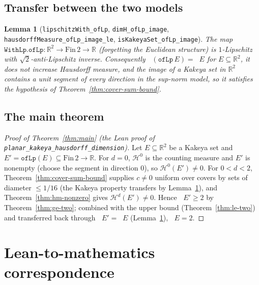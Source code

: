 \documentclass[11pt,a4paper]{article}
\newcommand{\R}{\mathbb{R}}
\DeclareMathOperator{\Hdim}{dim_H}
\newcommand{\HM}[1]{\mathcal{H}^{#1}}                %
\newcommand{\Plane}{\ensuremath{\mathbb{R}^{2}}}     %
\newcommand{\FinTwo}{\ensuremath{\mathrm{Fin}\,2 \to \R}}
\newcommand{\lname}[1]{\texttt{#1}}                  %
\newcommand{\lb}{\_\allowbreak}                      %
\newtheorem{lemma}[theorem]{Lemma}
\theoremstyle{definition}
\theoremstyle{remark}
\begin{document}
\subsection{Transfer between the two models}

\begin{lemma}[{\lname{lipschitzWith\_ofLp}, \lname{dimH\_ofLp\_image},
\lname{hausdorffMeasure\lb ofLp\lb image\lb le}, \lname{isKakeyaSet\lb ofLp\lb image}}]
\label{lem:transfer}
The map $\lname{WithLp.ofLp}:\Plane\to\FinTwo$ (forgetting the Euclidean structure) is
$1$-Lipschitz with $\sqrt2$-anti-Lipschitz inverse.  Consequently
$\Hdim(\lname{ofLp}\,E)=\Hdim E$ for $E\subseteq\Plane$, it does not increase Hausdorff
measure, and the image of a Kakeya set in $\Plane$ contains a unit segment of every
direction in the sup-norm model, so it satisfies the hypothesis of
Theorem~\ref{thm:cover-sum-bound}.
\end{lemma}

\subsection{The main theorem}

\begin{proof}[Proof of Theorem~\ref{thm:main} (the Lean proof of
\lname{planar\lb kakeya\lb hausdorff\lb dimension})]
Let $E\subseteq\Plane$ be a Kakeya set and $E'=\lname{ofLp}(E)\subseteq\FinTwo$.
For $d=0$, $\HM{0}$ is the counting measure and $E'$ is nonempty (choose the segment in
direction $0$), so $\HM{0}(E')\neq0$.  For $0<d<2$,
Theorem~\ref{thm:cover-sum-bound} supplies $c\neq0$ uniform over covers by sets of
diameter $\le 1/16$ (the Kakeya property transfers by Lemma~\ref{lem:transfer}), and
Theorem~\ref{thm:hm-nonzero} gives $\HM{d}(E')\neq0$.  Hence
$\Hdim E'\ge 2$ by Theorem~\ref{thm:ge-two}; combined with the upper bound
(Theorem~\ref{thm:le-two}) and transferred back through
$\Hdim E' = \Hdim E$ (Lemma~\ref{lem:transfer}), $\Hdim E = 2$.
\end{proof}

\section{Lean-to-mathematics correspondence}
\label{sec:correspondence}
\end{document}
